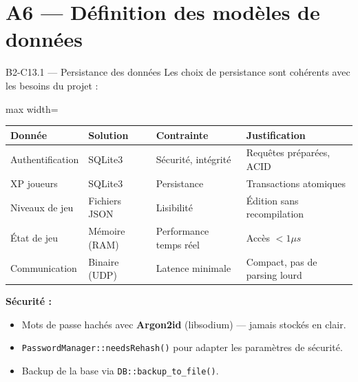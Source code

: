 \documentclass[aspectratio=169,10pt]{beamer}
\begin{document}
\section{A6 — Définition des modèles de données}

\begin{frame}{B2-C13.1 — Persistance des données}
\footnotesize
Les choix de persistance sont cohérents avec les besoins du projet :

\vspace{0.2em}
\begin{adjustbox}{max width=\textwidth}
\begin{tabular}{l l l l}
\toprule
\textbf{Donnée} & \textbf{Solution} & \textbf{Contrainte} & \textbf{Justification} \\
\midrule
Authentification  & SQLite3         & Sécurité, intégrité      & Requêtes préparées, ACID \\
XP joueurs        & SQLite3         & Persistance              & Transactions atomiques \\
Niveaux de jeu    & Fichiers JSON   & Lisibilité               & Édition sans recompilation \\
État de jeu       & Mémoire (RAM)   & Performance temps réel   & Accès $< 1\mu s$ \\
Communication     & Binaire (UDP)   & Latence minimale         & Compact, pas de parsing lourd \\
\bottomrule
\end{tabular}
\end{adjustbox}

\vspace{0.3em}
\textbf{Sécurité :}
\begin{itemize}\setlength\itemsep{1pt}
  \item Mots de passe hachés avec \textbf{Argon2id} (libsodium) — jamais stockés en clair.
  \item \texttt{PasswordManager::needsRehash()} pour adapter les paramètres de sécurité.
  \item Backup de la base via \texttt{DB::backup\_to\_file()}.
\end{itemize}
\end{frame}
\end{document}
